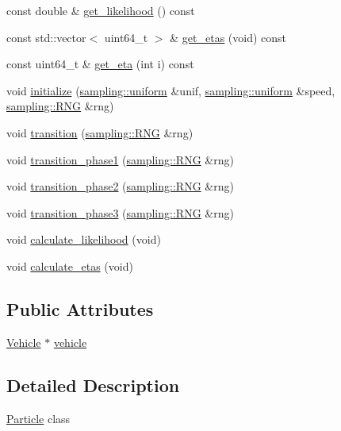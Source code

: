 \begin{DoxyCompactItemize}
\item 
const double \& \hyperlink{classgtfs_1_1Particle_a2e1a6de0b7d0fd6938ef3f7f9e5d4b99}{get\+\_\+likelihood} () const
\item 
const std\+::vector$<$ uint64\+\_\+t $>$ \& \hyperlink{classgtfs_1_1Particle_ad1271a051a4040edc4ec47a188d75ad0}{get\+\_\+etas} (void) const
\item 
const uint64\+\_\+t \& \hyperlink{classgtfs_1_1Particle_aded5954299e6184a664973036f8ba804}{get\+\_\+eta} (int i) const
\item 
void \hyperlink{classgtfs_1_1Particle_a4b1e356f32d4557d06c9ed59467a5b27}{initialize} (\hyperlink{classsampling_1_1uniform}{sampling\+::uniform} \&unif, \hyperlink{classsampling_1_1uniform}{sampling\+::uniform} \&speed, \hyperlink{classsampling_1_1RNG}{sampling\+::\+R\+NG} \&rng)
\item 
void \hyperlink{classgtfs_1_1Particle_a18aeb1ccbc395210f80c18f9d0a0095c}{transition} (\hyperlink{classsampling_1_1RNG}{sampling\+::\+R\+NG} \&rng)
\item 
void \hyperlink{classgtfs_1_1Particle_a5e964d5aa4698335de3c75938e55f5cd}{transition\+\_\+phase1} (\hyperlink{classsampling_1_1RNG}{sampling\+::\+R\+NG} \&rng)
\item 
void \hyperlink{classgtfs_1_1Particle_ad9374830814c89b2d5c0af705bda8849}{transition\+\_\+phase2} (\hyperlink{classsampling_1_1RNG}{sampling\+::\+R\+NG} \&rng)
\item 
void \hyperlink{classgtfs_1_1Particle_a68043b2380d8f530d648dd99e5a85101}{transition\+\_\+phase3} (\hyperlink{classsampling_1_1RNG}{sampling\+::\+R\+NG} \&rng)
\item 
void \hyperlink{classgtfs_1_1Particle_a88627efbe0eb2e289315ae82627d3a39}{calculate\+\_\+likelihood} (void)
\item 
void \hyperlink{classgtfs_1_1Particle_aa71d322362f6eb431f70f78cdc8887a8}{calculate\+\_\+etas} (void)
\end{DoxyCompactItemize}
\subsection*{Public Attributes}
\begin{DoxyCompactItemize}
\item 
\hyperlink{classgtfs_1_1Vehicle}{Vehicle} $\ast$ \hyperlink{classgtfs_1_1Particle_a81c313d505ecb592d79463f167dfb76c}{vehicle}
\end{DoxyCompactItemize}


\subsection{Detailed Description}
\hyperlink{classgtfs_1_1Particle}{Particle} class

